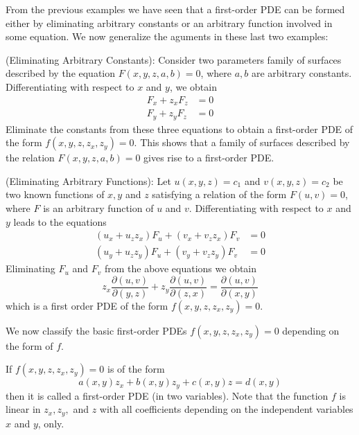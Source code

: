 \documentclass[12pt, a4paper, oneside, openright, titlepage]{book}
\begin{document}
From the previous examples we have seen that a first-order PDE can be formed either by eliminating arbitrary constants or an arbitrary function involved in some equation. We now generalize the aguments in these last two examples:

\begin{cust}[Method I]{(Eliminating Arbitrary Constants):}
    Consider two parameters family of surfaces described by the equation $F(x,y,z,a,b) = 0$, where $a,b$ are arbitrary constants. Differentiating with respect to $x$ and $y$, we obtain \begin{align*}
        F_x + z_xF_z &= 0 \\ 
        F_y + z_yF_z &= 0
    \end{align*}
    Eliminate the constants from these three equations to obtain a first-order PDE of the form $f(x,y,z,z_x,z_y) = 0$. This shows that a family of surfaces described by the relation $F(x,y,z,a,b) = 0$ gives rise to a first-order PDE.
\end{cust}

\begin{cust}[Method II]{(Eliminating Arbitrary Functions):}
    Let $u(x,y,z) = c_1$ and $v(x,y,z) = c_2$ be two known functions of $x, y$ and $z$ satisfying a relation of the form $F(u,v) = 0$, where $F$ is an arbitrary function of $u$ and $v$. Differentiating with respect to $x$ and $y$ leads to the equations \begin{align*}
        (u_x+u_zz_x)F_u+(v_x+v_zz_x)F_v &= 0 \\
        (u_y+u_zz_y)F_u+(v_y+v_zz_y)F_v &= 0 
    \end{align*}
    Eliminating $F_u$ and $F_v$ from the above equations we obtain \begin{equation*}
        z_x\frac{\partial(u,v)}{\partial(y,z)}+z_y\frac{\partial(u,v)}{\partial(z,x)} = \frac{\partial(u,v)}{\partial(x,y)}
    \end{equation*}
    which is a first order PDE of the form $f(x,y,z,z_x,z_y) = 0$.
\end{cust}

We now classify the basic first-order PDEs $f(x,y,z,z_x,z_y) = 0$ depending on the form of $f$.

\begin{defn}
    If $f(x,y,z,z_x,z_y) = 0$ is of the form \begin{equation*}
        a(x,y)z_x + b(x,y)z_y + c(x,y)z = d(x,y)
    \end{equation*}
    then it is called a  first-order PDE (in two variables). Note that the function $f$ is linear in $z_x,z_y,$ and $z$ with all coefficients depending on the independent variables $x$ and $y$, only.
\end{defn}
\end{document}
